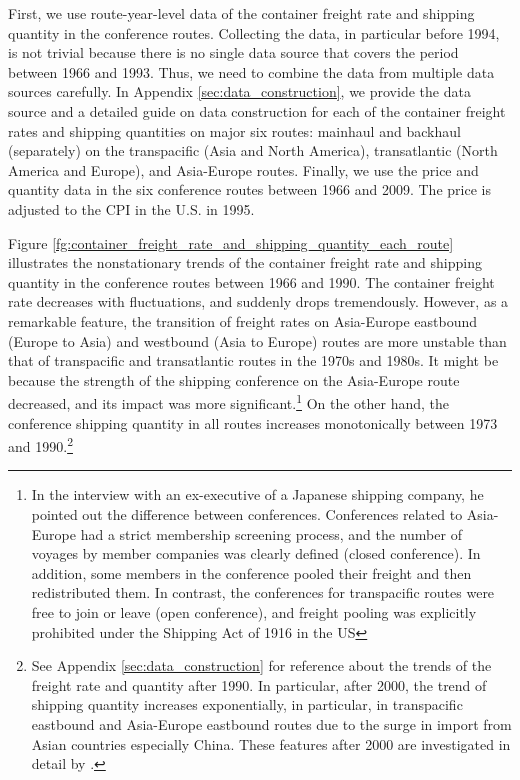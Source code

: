 \documentclass[11pt]{article}
\begin{document}
First, we use route-year-level data of the container freight rate and shipping quantity in the conference routes. Collecting the data, in particular before 1994, is not trivial because there is no single data source that covers the period between 1966 and 1993. Thus, we need to combine the data from multiple data sources carefully. In Appendix \ref{sec:data_construction}, we provide the data source and a detailed guide on data construction for each of the container freight rates and shipping quantities on major six routes: mainhaul and backhaul (separately) on the transpacific (Asia and North America), transatlantic (North America and Europe), and Asia-Europe routes. Finally, we use the price and quantity data in the six conference routes between 1966 and 2009. The price is adjusted to the CPI in the U.S. in 1995.

Figure \ref{fg:container_freight_rate_and_shipping_quantity_each_route} illustrates the nonstationary trends of the container freight rate and shipping quantity in the conference routes between 1966 and 1990. The container freight rate decreases with fluctuations, and suddenly drops tremendously. However, as a remarkable feature, the transition of freight rates on Asia-Europe eastbound (Europe to Asia) and westbound (Asia to Europe) routes are more unstable than that of transpacific and transatlantic routes in the 1970s and 1980s. It might be because the strength of the shipping conference on the Asia-Europe route decreased, and its impact was more significant.\footnote{In the interview with an ex-executive of a Japanese shipping company, he pointed out the difference between conferences. Conferences related to Asia-Europe had a strict membership screening process, and the number of voyages by member companies was clearly defined (closed conference). In addition, some members in the conference pooled their freight and then redistributed them. In contrast, the conferences for transpacific routes were free to join or leave (open conference), and freight pooling was explicitly prohibited under the Shipping Act of 1916 in the US} On the other hand, the conference shipping quantity in all routes increases monotonically between 1973 and 1990.\footnote{See Appendix \ref{sec:data_construction} for reference about the trends of the freight rate and quantity after 1990. In particular, after 2000, the trend of shipping quantity increases exponentially, in particular, in transpacific eastbound and Asia-Europe eastbound routes due to the surge in import from Asian countries especially China. These features after 2000 are investigated in detail by \cite{jeon2017learning}.} 
\end{document}
